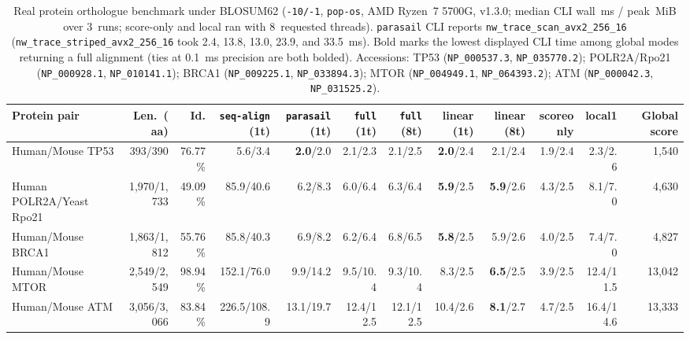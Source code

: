 \documentclass[11pt,a4paper]{article}
\begin{document}
\begin{table}[t]
\centering
\caption{Real protein orthologue benchmark under BLOSUM62 (\texttt{-10/-1}, \texttt{pop-os}, AMD Ryzen~7 5700G, v1.3.0; median CLI wall~ms / peak~MiB over 3~runs; score-only and local ran with 8~requested threads). \texttt{parasail} CLI reports \texttt{nw\_trace\_scan\_avx2\_256\_16} (\texttt{nw\_trace\_striped\_avx2\_256\_16} took 2.4, 13.8, 13.0, 23.9, and 33.5~ms). Bold marks the lowest displayed CLI time among global modes returning a full alignment (ties at 0.1~ms precision are both bolded). Accessions: TP53 (\texttt{NP\_000537.3}, \texttt{NP\_035770.2}); POLR2A/Rpo21 (\texttt{NP\_000928.1}, \texttt{NP\_010141.1}); BRCA1 (\texttt{NP\_009225.1}, \texttt{NP\_033894.3}); MTOR (\texttt{NP\_004949.1}, \texttt{NP\_064393.2}); ATM (\texttt{NP\_000042.3}, \texttt{NP\_031525.2}).}
\label{tab:protein}
\scriptsize
\setlength{\tabcolsep}{1.6pt}
\begin{tabular}{@{}lrrrrrrrrrrr@{}}
\toprule
Protein pair & Len.\ (aa) & Id. & \texttt{seq-align} (1t) & \texttt{parasail} (1t) & \texttt{full} (1t) & \texttt{full} (8t) & linear (1t) & linear (8t) & scoreonly & local1 & Global score \\
\midrule
Human/Mouse TP53 & 393/390 & 76.77\% & 5.6/3.4 & \textbf{2.0}/2.0 & 2.1/2.3 & 2.1/2.5 & \textbf{2.0}/2.4 & 2.1/2.4 & 1.9/2.4 & 2.3/2.6 & 1,540 \\
Human POLR2A/Yeast Rpo21 & 1,970/1,733 & 49.09\% & 85.9/40.6 & 6.2/8.3 & 6.0/6.4 & 6.3/6.4 & \textbf{5.9}/2.5 & \textbf{5.9}/2.6 & 4.3/2.5 & 8.1/7.0 & 4,630 \\
Human/Mouse BRCA1 & 1,863/1,812 & 55.76\% & 85.8/40.3 & 6.9/8.2 & 6.2/6.4 & 6.8/6.5 & \textbf{5.8}/2.5 & 5.9/2.6 & 4.0/2.5 & 7.4/7.0 & 4,827 \\
Human/Mouse MTOR & 2,549/2,549 & 98.94\% & 152.1/76.0 & 9.9/14.2 & 9.5/10.4 & 9.3/10.4 & 8.3/2.5 & \textbf{6.5}/2.5 & 3.9/2.5 & 12.4/11.5 & 13,042 \\
Human/Mouse ATM & 3,056/3,066 & 83.84\% & 226.5/108.9 & 13.1/19.7 & 12.4/12.5 & 12.1/12.5 & 10.4/2.6 & \textbf{8.1}/2.7 & 4.7/2.5 & 16.4/14.6 & 13,333 \\
\bottomrule
\end{tabular}
\end{table}
\end{document}
